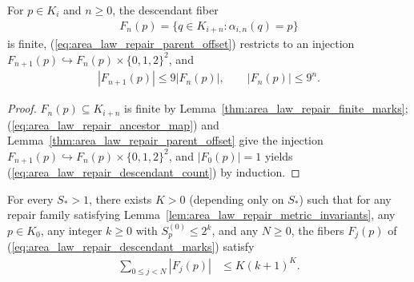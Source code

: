 \begin{lemma}
    \label{thm:area_law_repair_descendant_marks}
    \leanok
    For $p\in K_i$ and $n\ge0$, the descendant fiber
    \begin{align}
        F_n(p)=\{q\in K_{i+n}:\alpha_{i,n}(q)=p\}
        \label{eq:area_law_repair_descendant_marks}
    \end{align}
    is finite, (\ref{eq:area_law_repair_parent_offset}) restricts to an injection
    $F_{n+1}(p)\hookrightarrow F_n(p)\times\{0,1,2\}^2$, and
    \begin{align}
        |F_{n+1}(p)|\le9|F_n(p)|,
        \qquad |F_n(p)|\le9^n.
        \label{eq:area_law_repair_descendant_count}
    \end{align}
\end{lemma}
\begin{proof}\leanok
    $F_n(p)\subseteq K_{i+n}$ is finite by Lemma~\ref{thm:area_law_repair_finite_marks};
    (\ref{eq:area_law_repair_ancestor_map}) and Lemma~\ref{thm:area_law_repair_parent_offset}
    give the injection $F_{n+1}(p)\hookrightarrow F_n(p)\times\{0,1,2\}^2$, and $|F_0(p)|=1$
    yields (\ref{eq:area_law_repair_descendant_count}) by induction.
\end{proof}

\begin{lemma}
    \label{thm:area_law_repair_root_prefix_count}
    \leanok
    For every $S_*>1$, there exists $K>0$ (depending only on $S_*$) such that for any repair
    family satisfying Lemma~\ref{lem:area_law_repair_metric_invariants}, any $p\in K_0$, any
    integer $k\ge0$ with $S_p^{(0)}\le2^k$, and any $N\ge0$, the fibers $F_j(p)$ of
    (\ref{eq:area_law_repair_descendant_marks}) satisfy
    \begin{align}
        \sum_{0\le j<N}|F_j(p)| & \le K(k+1)^K.
        \label{eq:area_law_repair_root_prefix_count}
    \end{align}
\end{lemma}

